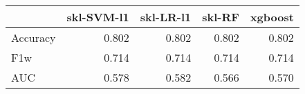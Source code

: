 \begin{tabular}{lrrrr}
\toprule
{} &  skl-SVM-l1 &  skl-LR-l1 &  skl-RF &  xgboost \\
\midrule
Accuracy &       0.802 &      0.802 &   0.802 &    0.802 \\
F1w      &       0.714 &      0.714 &   0.714 &    0.714 \\
AUC      &       0.578 &      0.582 &   0.566 &    0.570 \\
\bottomrule
\end{tabular}
